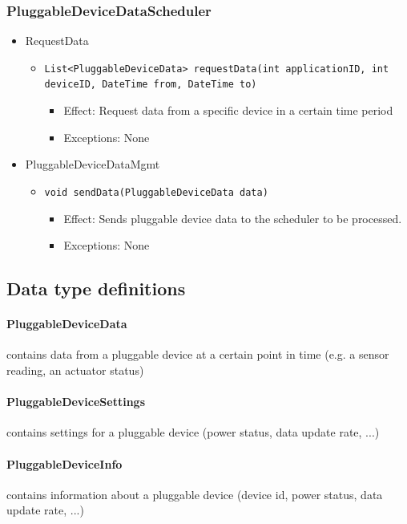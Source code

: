     \subsubsection{PluggableDeviceDataScheduler}
    \begin{itemize}
    	\item RequestData
    	\begin{itemize}
    		\item \texttt{List<PluggableDeviceData> requestData(int applicationID, int deviceID, DateTime from, DateTime to)}
    		\begin{itemize}
    			\item Effect: Request data from a specific device in a certain time period
    			\item Exceptions: None
    		\end{itemize}
    	\end{itemize}
    	\item PluggableDeviceDataMgmt
    	\begin{itemize}
    		\item \texttt{void sendData(PluggableDeviceData data)}
    		\begin{itemize}
    			\item Effect: Sends pluggable device data to the scheduler to be processed.
    			\item Exceptions: None
    		\end{itemize}
    	\end{itemize}
    \end{itemize}


\subsection{Data type definitions}
    \paragraph{PluggableDeviceData} contains data from a pluggable device at a certain point in time
                                    (e.g. a sensor reading, an actuator status)
    \paragraph{PluggableDeviceSettings} contains settings for a pluggable device (power status,
                                        data update rate, ...)
    \paragraph{PluggableDeviceInfo} contains information about a pluggable device (device id,
                                    power status, data update rate, ...)
